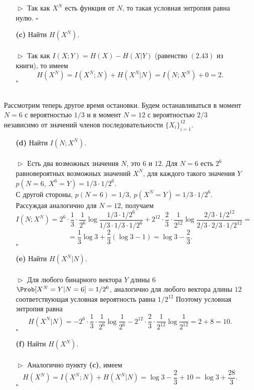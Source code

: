 \documentclass{article}
\begin{document}
\begin{enumerate}
\begin{enumerate}
\\\\$\vartriangleright$ Так как $X^N$ есть функция от $N$, то такая условная энтропия равна нулю. $\square$
\\
\item[\bfseries (c)] Найти $H(X^N)$.
\\\\$\vartriangleright$ Так как $I(X; Y) = H(X) - H(X|Y)$ (равенство $(2.43)$ из книги), то имеем $$H(X^N) = I(X^N; N) + H(X^N|N) = I(N; X^N) + 0 = 2.$$
$\square$
\\\\
\end{enumerate}
Рассмотрим теперь другое время остановки. Будем останавливаться в момент $N = 6$ с вероятностью $1/3$ и в момент $N = 12$ с вероятностью $2/3$ независимо от значений членов последовательности $\{X_i\}_{i = 1}^{12}$.
\newpage
\begin{enumerate}
\item[\bfseries (d)] Найти $I(N; X^N)$.
\\\\$\vartriangleright$ Есть два возможных значения $N$, это $6$ и $12$. Для $N = 6$ есть $2^6$ равновероятных возможных значений $X^N$, для каждого такого значения $Y$ $p(N = 6,\ X^6 = Y) = 1/3 \cdot 1/2^6$. 
\\С другой стороны, $p(N = 6) = 1/3,\ p(X^N = Y) = 1/3 \cdot 1/2^6.$ Рассуждая аналогично для $N = 12$, получаем
$$I(N; X^N) = 2^6 \cdot \frac{1}{3} \cdot \frac{1}{2^6}\log \frac{1/3 \cdot 1/2^6}{1/3 \cdot  1/3 \cdot 1/2^6} + 2^{12} \cdot \frac{2}{3} \cdot \frac{1}{2^{12}}\log \frac{2/3 \cdot 1/2^{12}}{2/3 \cdot  2/3 \cdot 1/2^{12}} =$$ 
$$= \frac{1}{3}\log 3 + \frac{2}{3}(\log 3 - 1) = \log 3 - \frac{2}{3}.$$
$\square$
\\
\item[\bfseries (e)] Найти $H(X^N|N).$
\\\\$\vartriangleright$ Для любого бинарного вектора $Y$ длины $6$ $\Prob[X^N = Y | N = 6] = 1/2^6$, аналогично для любого вектора длины $12$ соответствующая условная вероятность равна $1/2^{12}$ Поэтому условная энтропия равна
$$H(X^N|N) = -2^6 \cdot \frac{1}{3} \cdot \frac{1}{2^6} \log \frac{1}{2^6} - 2^{12} \cdot \frac{2}{3} \cdot \frac{1}{2^{12}} \log \frac{1}{2^{12}} = 2 + 8 = 10.$$
$\square$
\\
\item[\bfseries (f)] Найти $H(X^N).$ 
\\\\$\vartriangleright$ Аналогично пункту {\bfseries (c)}, имеем
$$H(X^N) =  I(X^N; N) + H(X^N|N) = \log 3 - \frac{2}{3} + 10 = \log 3 + \frac{28}{3}.$$
$\square$
\end{enumerate}
\end{enumerate}
\end{document}
